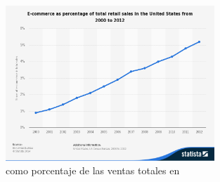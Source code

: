 
\begin{figure}[h!]
	\centering
	\includegraphics[width=0.7\textwidth]{figuras/ecommerce_percent.jpg}
	\caption{\ecommerceCOM como porcentaje de las ventas totales en \usaNAME \cite{online_total_sales_2000_2012}}
	\label{figure:ecommerce_percent_sales}
\end{figure}